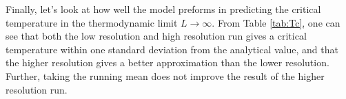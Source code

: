 Finally, let's look at how well the model preforms in predicting the critical temperature in the thermodynamic limit $L\rightarrow \infty$. From Table \ref{tab:Tc}, one can see that both the low resolution and high resolution run gives a critical temperature within one standard deviation from the analytical value, and that the higher resolution gives a better approximation than the lower resolution. Further, taking the running mean does not improve the result of the higher resolution run.  